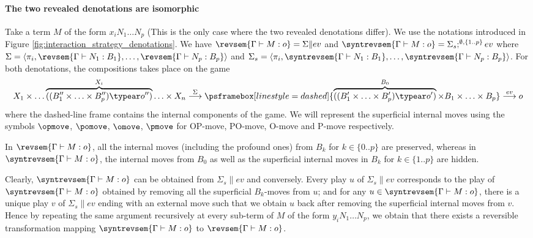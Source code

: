     \paragraph{The two revealed denotations are isomorphic}

    Take a term $M$ of the form $x_i N_1 \ldots N_p$ (This is the only case where the two revealed denotations differ). We use the notations introduced in Figure \ref{fig:interaction_strategy_denotations}.
    We have $\revsem{\Gamma \vdash M : o} =  \Sigma \|  ev$ and $\syntrevsem{\Gamma \vdash M : o} =  \Sigma_s ;^{\emptyset,\{1..p\}} ev$ where $\Sigma = \langle \pi_i, \revsem{\Gamma \vdash N_1 : B_1}, \ldots, \revsem{\Gamma \vdash N_p : B_p} \rangle$ and $\Sigma_s = \langle \pi_i, \syntrevsem{\Gamma \vdash N_1 : B_1}, \ldots, \syntrevsem{\Gamma \vdash N_p : B_p} \rangle$. For both denotations, the compositions takes place on the game
    $$ X_1 \times \ldots \overbrace{((B_1'' \times \ldots \times B_p'') \typear o'')}^{X_i} \ldots \times X_n \stackrel\Sigma\longrightarrow \psframebox[linestyle=dashed]{ \overbrace{((B_1' \times \ldots \times B_p') \typear o')}^{B_0} \times B_1 \times \ldots \times B_p }\stackrel{ev}\longrightarrow o$$
    where the dashed-line frame contains the internal components of the game. We will represent the superficial internal moves using the symbols $\opmove$, $\pomove$, $\omove$, $\pmove$ for OP-move, PO-move, O-move and P-move respectively.

    In $\revsem{\Gamma \vdash M : o}$, all the internal moves (including the profound ones) from $B_k$ for $k\in \{0..p\}$ are preserved, whereas in $\syntrevsem{\Gamma \vdash M : o}$, the internal moves from $B_0$ as well as the superficial internal moves in $B_k$ for $k\in \{1..p\}$ are hidden.


    Clearly, $\syntrevsem{\Gamma \vdash M : o}$ can be obtained from $\Sigma_s \| ev$ and conversely. Every play $u$ of $\Sigma_s \| ev$ corresponds to the play of $\syntrevsem{\Gamma \vdash M : o}$ obtained by removing all the superficial $B_k$-moves from $u$; and for any $u \in \syntrevsem{\Gamma \vdash M : o}$, there is a unique play $v$ of $\Sigma_s \| ev$ ending with an external move such that we obtain $u$ back after removing the superficial internal moves from $v$.
    Hence by repeating the same argument recursively at every sub-term of $M$ of the form $y_i N_1 \ldots N_p$, we obtain that
    there exists a reversible transformation mapping $\syntrevsem{\Gamma \vdash M : o}$ to $\revsem{\Gamma \vdash M : o}$.


